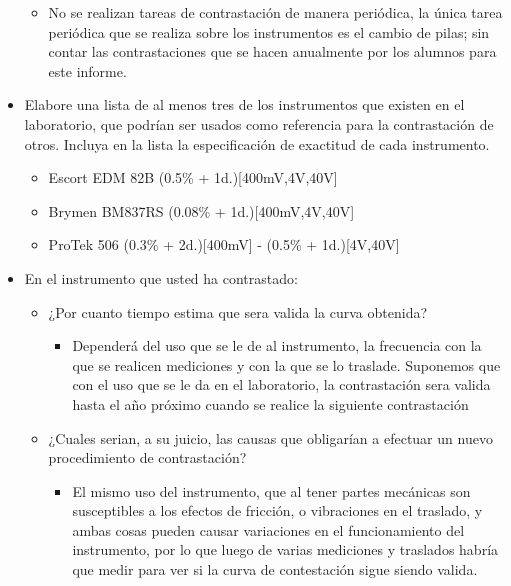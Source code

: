 \begin{itemize}
  \begin{itemize} 
    \item No se realizan tareas de contrastación de manera periódica, la única tarea periódica que se realiza sobre los instrumentos es el cambio de pilas; sin contar las contrastaciones que se hacen anualmente por los alumnos para este informe.
  \end{itemize}
  \item Elabore una lista de al menos tres de los instrumentos que existen en el laboratorio, que podrían ser usados como referencia para la contrastación de otros. Incluya en la lista la especificación de exactitud de cada instrumento.
  \begin{itemize}
    \item Escort EDM 82B (0.5\% + 1d.)[400mV,4V,40V]
    \item Brymen BM837RS (0.08\% + 1d.)[400mV,4V,40V]
    \item ProTek 506 (0.3\% + 2d.)[400mV] - (0.5\% + 1d.)[4V,40V]
  \end{itemize}
  \item En el instrumento que usted ha contrastado:
  \begin{itemize}
    \item ¿Por cuanto tiempo estima que sera valida la curva obtenida?
      \begin{itemize}
        \item Dependerá del uso que se le de al instrumento, la frecuencia con la que se realicen mediciones y con la que se lo traslade. Suponemos que con el uso que se le da en el laboratorio, la contrastación sera valida hasta el año próximo cuando se realice la siguiente contrastación
      \end{itemize}
    \item ¿Cuales serian, a su juicio, las causas que obligarían a efectuar un nuevo procedimiento de contrastación?
      \begin{itemize}
        \item El mismo uso del instrumento, que al tener partes mecánicas son susceptibles a los efectos de fricción, o vibraciones en el traslado, y ambas cosas pueden causar variaciones en el funcionamiento del instrumento, por lo que luego de varias mediciones y traslados habría que medir para ver si la curva de contestación sigue siendo valida.
      \end{itemize}
  \end{itemize}
\end{itemize}

